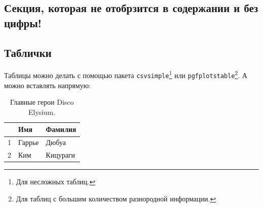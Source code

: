 \documentclass[12pt,a4paper]{article}
\begin{document}
\subsection*{Секция, которая не отобрзится в содержании и без цифры!}

\textcolor{gray}{}


\subsection{Таблички}

Таблицы можно делать с помощью пакета \texttt{csvsimple}\footnote{Для несложных таблиц.} или \texttt{pgfplotstable}\footnote{Для таблиц с большим количеством разнородной информации.}. А можно вставлять напрямую:

\begin{table}[h!]
	\centering
	\begin{tabular}{|c|l|l|} \hline
		& \textbf{Имя} & \textbf{Фамилия} \\ \hline
		1 & Гаррье & Дюбуа \\ \hline
		2 & Ким & Кицураги \\ \hline
	\end{tabular}
	\caption{Главные герои Disco Elysium.}
	\label{table:disco_main_characters}
\end{table}
\end{document}
